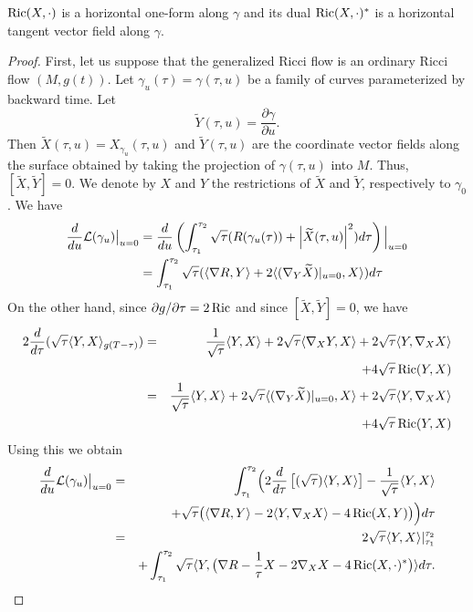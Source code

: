 \begin{remark}\label{rem:ricci-one-form-dual}

$\operatorname{Ric}(X,\cdot)$ is a horizontal one-form along $\gamma$ and its
dual $\operatorname{Ric}(X,\cdot)^*$ is a horizontal tangent vector field
along $\gamma$.
\end{remark}

\begin{proof}
\sketch
{}
First, let us suppose that the
generalized Ricci flow is an ordinary Ricci flow $(M,g(t))$. Let
$\gamma_u(\tau)=\gamma(\tau,u)$ be a family of curves parameterized
by backward time. Let
$$\widetilde Y(\tau,u)=\frac{\partial\gamma}{\partial u}.$$ Then $\widetilde X(\tau,u)=X_{\gamma_u}(\tau,u)$
 and $\widetilde Y(\tau,u)$
are  the coordinate vector fields along the surface obtained by taking the
projection of $\gamma(\tau,u)$ into $M$. Thus, $[\widetilde X,\widetilde Y]
=0$. We denote by $X$ and $Y$ the restrictions of $\widetilde X$ and
$\widetilde Y$, respectively to $\gamma_0$. We have
\begin{align*}
\frac{d}{du}\mathcal{L}(\gamma_{u})\bigl|_{u=0}\bigr.  & =
\frac{d}{du}\left(\int_{\tau_{1}}^{\tau_{2}}
\sqrt{\tau}(R(\gamma_u(\tau)) + \left\vert\widetilde
X(\tau,u)\right\vert^{2})d\tau\right)\Bigl|_{u=0}\Bigr.
\\&=\int_{\tau_{1}}^{\tau_{2}} \sqrt{\tau}(\langle \nabla R, Y\rangle  +
2\langle (\nabla_{Y}\widetilde X)|_{u=0},X\rangle )d\tau
\end{align*}
On the other hand, since $\partial g/\partial \tau =2\operatorname{Ric}$ and
since $[\widetilde X,\widetilde Y]=0$, we have
\begin{eqnarray*} 2\frac{d}{d\tau}(\sqrt{\tau}\langle Y,X\rangle_{g(T-\tau)} )
& = & \frac{1}{\sqrt{\tau}}\langle Y,X\rangle +
2\sqrt{\tau}\langle\nabla_XY,X\rangle
+2\sqrt{\tau}\langle Y,\nabla_XX\rangle \\ & & +4\sqrt{\tau}\operatorname{Ric}(Y,X) \\
& = & \frac{1}{\sqrt{\tau}}\langle Y,X\rangle  +
2\sqrt{\tau}\langle(\nabla_Y\widetilde X)|_{u=0},X\rangle
+2\sqrt{\tau}\langle Y,\nabla_XX\rangle \\ & &  +4\sqrt{\tau}\operatorname{Ric}(Y,X)
\end{eqnarray*}
Using this we obtain \begin{eqnarray}\nonumber \frac{d}{du}
\mathcal{L}(\gamma_u)\bigl|_{u=0}\bigr. & = & \int_{\tau_1}^{\tau_2}
\Bigl(2\frac{d}{d\tau}\left[(\sqrt{\tau})\langle
Y,X\rangle\right]-\frac{1}{\sqrt{\tau}}\langle
Y,X\rangle\Bigr. \\
& & +\sqrt{\tau}\bigl(\langle\nabla R,Y\rangle
 - 2\langle Y,\nabla_{X}X\rangle  - 4\operatorname{Ric}(X,Y)\bigr)\Bigr)d\tau \nonumber \\
 & = & 2\sqrt{\tau}\langle Y,X\rangle |_{\tau_{1}}^{\tau_{2}} \nonumber \\
& & + \int_{\tau_{1}}^{\tau_{2}} \sqrt{\tau}\langle Y,\bigl(\nabla R
- \frac{1}{\tau}X - 2\nabla_{X}X - 4\operatorname{Ric}(X,\cdot)^*\bigr)\rangle d\tau.\label{variation}
\end{eqnarray}


\end{proof}
